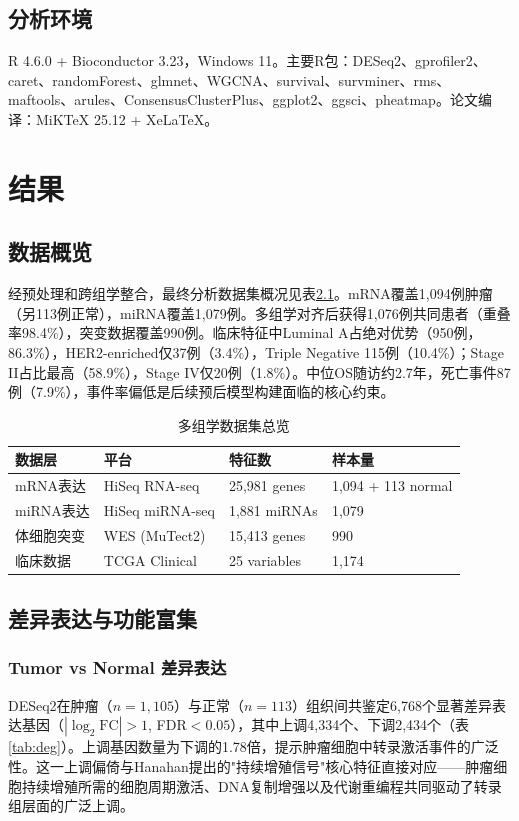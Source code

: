 \documentclass[12pt,a4paper,openany]{ctexbook}
\begin{document}
\section{分析环境}
R 4.6.0 + Bioconductor 3.23，Windows 11。主要R包：DESeq2、gprofiler2、caret、randomForest、glmnet、WGCNA、survival、survminer、rms、maftools、arules、ConsensusClusterPlus、ggplot2、ggsci、pheatmap。论文编译：MiKTeX 25.12 + XeLaTeX。

\chapter{结果}

\section{数据概览}
经预处理和跨组学整合，最终分析数据集概况见表\ref{tab:data}。mRNA覆盖1,094例肿瘤（另113例正常），miRNA覆盖1,079例。多组学对齐后获得1,076例共同患者（重叠率98.4\%），突变数据覆盖990例。临床特征中Luminal A占绝对优势（950例，86.3\%），HER2-enriched仅37例（3.4\%），Triple Negative 115例（10.4\%）；Stage II占比最高（58.9\%），Stage IV仅20例（1.8\%）。中位OS随访约2.7年，死亡事件87例（7.9\%），事件率偏低是后续预后模型构建面临的核心约束。

\begin{table}[H]
\centering\caption{多组学数据集总览}\label{tab:data}
\begin{tabular}{llll}\toprule
数据层 & 平台 & 特征数 & 样本量 \\\midrule
mRNA表达 & HiSeq RNA-seq & 25,981 genes & 1,094 + 113 normal \\
miRNA表达 & HiSeq miRNA-seq & 1,881 miRNAs & 1,079 \\
体细胞突变 & WES (MuTect2) & 15,413 genes & 990 \\
临床数据 & TCGA Clinical & 25 variables & 1,174 \\\bottomrule
\end{tabular}
\end{table}

\section{差异表达与功能富集}

\subsection{Tumor vs Normal 差异表达}
DESeq2在肿瘤（$n=1,105$）与正常（$n=113$）组织间共鉴定6,768个显著差异表达基因（$|\log_2\text{FC}|>1$, FDR$<0.05$），其中上调4,334个、下调2,434个（表\ref{tab:deg}）。上调基因数量为下调的1.78倍，提示肿瘤细胞中转录激活事件的广泛性。这一上调偏倚与Hanahan\cite{hanahan2011hallmarks}提出的"持续增殖信号"核心特征直接对应——肿瘤细胞持续增殖所需的细胞周期激活、DNA复制增强以及代谢重编程共同驱动了转录组层面的广泛上调。
\end{document}
